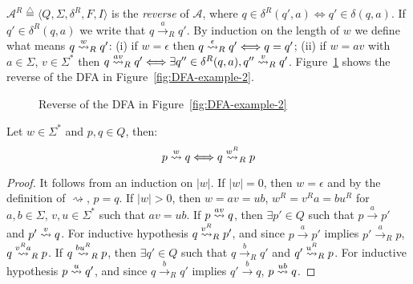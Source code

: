 $\mathcal{A}^{R} \overset{\triangle}{=} \langle Q, \Sigma, \delta^{R}, F, I \rangle$
is the \emph{reverse} of $\mathcal{A}$, where
$q \in \delta^{R}(q',a) \Longleftrightarrow q' \in \delta (q,a)$.
If $q' \in \delta^R(q,a)$ we write that $q \overset{a}{\rightarrow}_R q'$.
By induction on the length of $w$ we define what means $q \overset{w}{\rightsquigarrow}_R q'$:
(i) if $w = \epsilon$ then $q \overset{\epsilon}{\rightsquigarrow}_R q' \Longleftrightarrow q = q'$;
(ii) if $w = av$ with $a \in \Sigma$,  $v \in \Sigma^*$ then
$q \overset{av}{\rightsquigarrow}_R q' \Longleftrightarrow \exists q'' \in \delta^R (q,a), q'' \overset{v}{\rightsquigarrow}_R q' $.
Figure~\ref{fig:reverse-example} shows the reverse of the DFA in
Figure~\ref{fig:DFA-example-2}.

\begin{figure}[h]
\centering
{}
\caption{Reverse of the DFA in Figure~\ref{fig:DFA-example-2}}
\label{fig:reverse-example}
\end{figure}


\begin{lemma}
\label{lemma:goes-retro}
Let $w \in \Sigma^*$ and $p,q \in Q$, then:
\[ p \overset{w}{\rightsquigarrow} q \Longleftrightarrow q \overset{w^R}{\rightsquigarrow}_R p \]
\end{lemma}

\begin{proof}
It follows from an induction on $|w|$.
If $|w|=0$, then $w = \epsilon$ and by the definition of $\rightsquigarrow$, $p=q$.
If $|w| > 0$, then $w=av=ub$, $w^R=v^Ra=bu^R$ for $a,b \in \Sigma$, $v,u \in \Sigma^*$
such that $av = ub$.
If $p \overset{av}{\rightsquigarrow} q$, then $\exists p' \in Q$ such that $p \overset{a}{\rightarrow} p'$
and $p' \overset{v}{\rightsquigarrow} q$.
For inductive hypothesis $q \overset{v^R}{\rightsquigarrow}_R p'$, and since $p \overset{a}{\rightarrow} p'$
implies $p' \overset{a}{\rightarrow}_R p$, $q \overset{v^R a}{\rightsquigarrow}_R p$.
If $q \overset{bu^R}{\rightsquigarrow}_R p$, then $\exists q' \in Q$
such that $q \overset{b}{\rightarrow}_R q'$
and $q' \overset{u^R}{\rightsquigarrow}_R p$.
For inductive hypothesis $p \overset{u}{\rightsquigarrow} q'$,
and since $q \overset{b}{\rightarrow}_R q'$
implies $q' \overset{b}{\rightarrow} q$, $p \overset{ub}{\rightsquigarrow} q$.
\end{proof}

